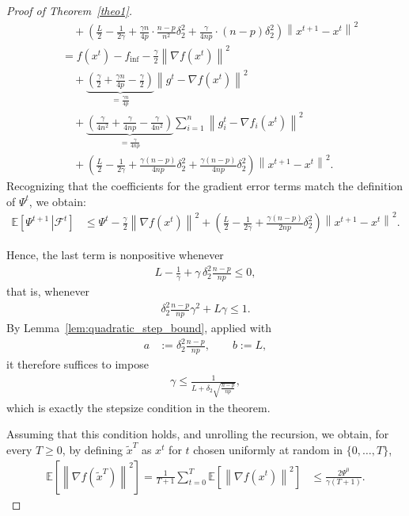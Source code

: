 \documentclass{article}
\newcommand{\bb}{\mathbb}
\newcommand{\sqn}[1]{\left\| #1 \right\|^2}
\newcommand{\finf}{f_\mathrm{inf}}
\newcommand{\eqdef}{:=}
\newcommand{\Exp}[1]{{\bb E}\left[#1\right]}
\newcommand{\Expb}[2]{\mathbb{E}\!\left[\left. #1\,\right|#2 \right]}
\newcommand{\Expc}[1]{\Expb{#1}{\mathcal{F}^t}}
\theoremstyle{plain}
\begin{document}
\begin{proof}[Proof of Theorem~\ref{theo1}]
\begin{align*}
&\quad + \left(\frac{L}{2}-\frac{1}{2\gamma}+ \frac{\gamma n}{4p}\cdot\frac{n-p}{n^2}\delta_2^2 + \frac{\gamma}{4np}\cdot(n-p)\delta_2^2 \right) \sqn{x^{t+1}-x^t}\\
&= f(x^t) - \finf -\frac{\gamma}{2}\sqn{\nabla f(x^t)} \\
&\quad + \underbrace{\left( \frac{\gamma}{2} + \frac{\gamma n}{4p} - \frac{\gamma}{2} \right)}_{= \frac{\gamma n}{4p}} \sqn{g^{t}-\nabla f(x^t)}\\
&\quad + \underbrace{\left( \frac{\gamma}{4n^2} + \frac{\gamma}{4np} - \frac{\gamma}{4n^2} \right)}_{= \frac{\gamma}{4np}}\sum_{i=1}^n\sqn{g_i^t-\nabla f_{i}(x^{t})}\\
&\quad + \left(\frac{L}{2}-\frac{1}{2\gamma}+ \frac{\gamma(n-p)}{4np}\delta_2^2 + \frac{\gamma(n-p)}{4np}\delta_2^2 \right) \sqn{x^{t+1}-x^t}.
\end{align*}
Recognizing that the coefficients for the gradient error terms match the definition of $\Psi^t$, we obtain:
\begin{align*}
\Expc{\Psi^{t+1}} &\leq \Psi^t -\frac{\gamma}{2}\sqn{\nabla f(x^t)} +\left(\frac{L}{2}-\frac{1}{2\gamma}+\frac{\gamma(n-p)}{2np}\delta_2^2 \right) \sqn{x^{t+1}-x^t}.
\end{align*}

Hence, the last term is nonpositive whenever
\begin{align*}
L-\frac{1}{\gamma}+\gamma\,\delta_2^2\frac{n-p}{np}\leq 0,
\end{align*}
that is, whenever
\begin{align*}
\delta_2^2\frac{n-p}{np}\gamma^2+L\gamma\leq 1.
\end{align*}
By Lemma~\ref{lem:quadratic_step_bound}, applied with
\begin{align*}
a &\eqdef \delta_2^2\frac{n-p}{np},
\qquad
b \eqdef L,
\end{align*}
it therefore suffices to impose
\begin{align*}
\gamma\leq \frac{1}{L+\delta_2\sqrt{\frac{n-p}{np}}},
\end{align*}
which is exactly the stepsize condition in the theorem.

Assuming that this condition holds, and unrolling the recursion, we obtain, for every $T\geq 0$, by defining $\tilde{x}^T$ as $x^t$ for $t$ chosen uniformly at random in $\{0,\ldots,T\}$,
\begin{align*}
\Exp{\sqn{\nabla f(\tilde{x}^T)}} =\frac{1}{T+1}\sum_{t=0}^{T} \Exp{\sqn{\nabla f(x^t)}} &\leq \frac{2\Psi^0}{\gamma(T+1)}.
\end{align*}



\end{proof}
\end{document}
